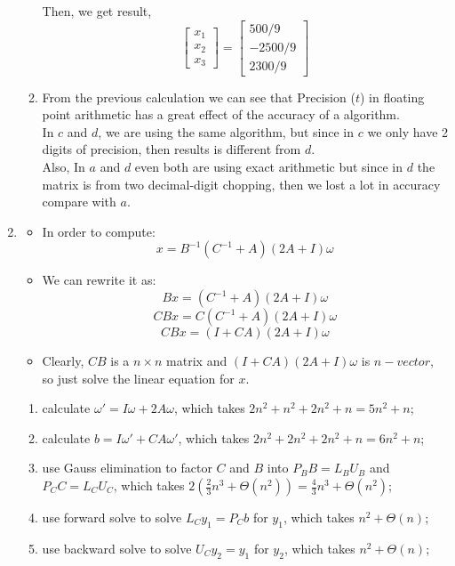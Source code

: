 \documentclass[11pt,twoside]{article}
\begin{document}
\begin{enumerate}
\begin{enumerate}
				Then, we get result,
				\[ \left. \begin{bmatrix}
				x_1  \\
				x_2   \\
				x_3   \end{bmatrix} \right. = \left. \begin{bmatrix}
				 500/9\\
				-2500/9   \\
				2300/9   \end{bmatrix} \right.\] 

		\item From the previous calculation we can see that  Precision ($t$) in floating point arithmetic has a great effect of the accuracy of a algorithm. \\
		In $c$ and $d$,  we are using the same algorithm, but since in $c$ we only have 2 digits of precision, then results is different from $d$. \\
		Also, In $a$ and $d$ even both are using exact arithmetic but since in $d$ the matrix is from two decimal-digit chopping, then we lost a lot in accuracy compare with $a$.
	\end{enumerate}
\item		
		\begin{itemize}[label = {}]
			\item In order to compute:
			\[ x = B^{-1}(C^{-1} + A)(2A + I) \omega \]
			\item We can rewrite it as:
			\[Bx = (C^{-1} + A)(2A+I)\omega\]
			\[CBx = C(C^{-1} + A)(2A+I)\omega\]
			\[CBx = (I + CA)(2A+I)\omega\]
			\item Clearly, $CB$ is a $n\times n$ matrix and $(I + CA)(2A+I)\omega$ is $n-vector$, so just
			solve the linear equation for $x$.	 
		 \end{itemize}
		 \begin{enumerate}[label = {\arabic*}]
		 \item calculate $\omega' = I\omega + 2A\omega$, which takes $2n^2 + n^2+2n^2 +n= 5n^2 +n$;
		 \item calculate $b = I\omega' + CA\omega'$, which takes $2n^2 + 2n^2+2n^2  + n= 6n^2 +n$;
		 \item use Gauss elimination to factor $C$ and $B$ into $P_BB = L_BU_B$ and $P_CC = L_CU_C$, which takes $2(\frac{2}{3}n^3 + \Theta(n^2)) = \frac{4}{3}n^3 + \Theta(n^2)$;
		 \item use forward solve to solve $L_Cy_1 = P_Cb$ for $y_1$,  which takes $n^2 + \Theta(n)$;
		 \item use backward solve to solve $U_Cy_2 = y_1$ for $y_2$,  which takes $n^2 + \Theta(n)$;

\end{enumerate}
\end{enumerate}
\end{document}
